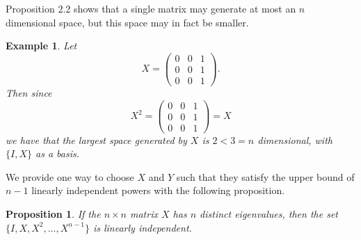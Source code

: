 \documentclass[11pt]{amsart}
\newtheorem{proposition}[theorem]{Proposition}
\numberwithin{equation}{section}
\numberwithin{figure}{section}
\numberwithin{theorem}{section}
\newtheorem{example}{Example}
\begin{document}
Proposition 2.2 shows that a single matrix may generate at most an $n$ dimensional space, but this space may in fact be smaller. 
\begin{example}
Let $$X=\begin{pmatrix}0&0&1\\0&0&1\\0&0&1\end{pmatrix}.$$ Then since $$X^2=\begin{pmatrix}0&0&1\\0&0&1\\0&0&1\end{pmatrix}=X$$ we have that the largest space generated by $X$ is $2<3=n$ dimensional, with $\{I,X\}$ as a basis. 
\end{example}
We provide one way to choose $X$ and $Y$ such that they satisfy the upper bound of $n-1$ linearly independent powers with the following proposition. 
\begin{proposition}
If the $n\times n$ matrix $X$ has $n$ distinct eigenvalues, then the set $\{I,X,X^2,\ldots, X^{n-1}\}$ is linearly independent. 
\end{proposition}
\end{document}
